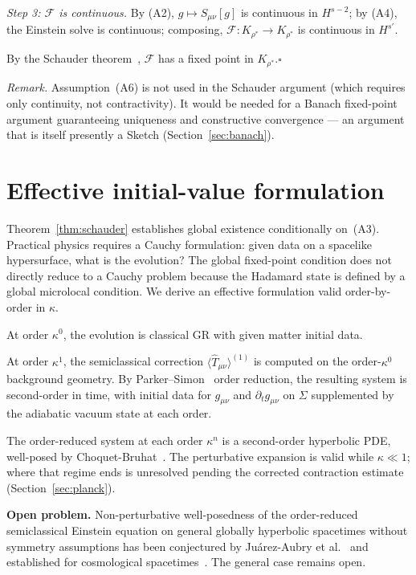 \documentclass[12pt,a4paper]{article}
\begin{document}
\smallskip\noindent\textit{Step 3: $\mathcal{F}$ is continuous.} By (A2), $g\mapsto
S_{\mu\nu}[g]$ is continuous in $H^{s-2}$; by (A4), the Einstein solve is continuous;
composing, $\mathcal{F}: K_{\rho^*}\to K_{\rho^*}$ is continuous in $H^{s'}$.

\smallskip\noindent By the Schauder theorem~\cite{schauder}, $\mathcal{F}$ has a fixed
point in $K_{\rho^*}$.\hfill$\square$

\noindent\emph{Remark.} Assumption~(A6) is not used in the Schauder argument (which
requires only continuity, not contractivity). It would be needed for a Banach fixed-point
argument guaranteeing uniqueness and constructive convergence --- an argument that is
itself presently a Sketch (Section~\ref{sec:banach}).

\section{Effective initial-value formulation}
\label{sec:ivp}

Theorem~\ref{thm:schauder} establishes global existence conditionally on~(A3).
Practical physics requires a
Cauchy formulation: given data on a spacelike hypersurface, what is the evolution? The
global fixed-point condition does not directly reduce to a Cauchy problem because the
Hadamard state is defined by a global microlocal condition. We derive an effective
formulation valid order-by-order in $\kappa$.

At order $\kappa^0$, the evolution is classical GR with given matter initial data.

At order $\kappa^1$, the semiclassical correction $\langle\hat{T}_{\mu\nu}\rangle^{(1)}$
is computed on the order-$\kappa^0$ background geometry. By Parker--Simon~\cite{parker_simon}
order reduction, the resulting system is second-order in time, with initial data for
$g_{\mu\nu}$ and $\partial_t g_{\mu\nu}$ on $\Sigma$ supplemented by the adiabatic vacuum
state at each order.

The order-reduced system at each order $\kappa^n$ is a second-order hyperbolic PDE,
well-posed by Choquet-Bruhat~\cite{choquet_bruhat}. The perturbative expansion is valid
while $\kappa \ll 1$; where that regime ends is unresolved pending the corrected
contraction estimate (Section~\ref{sec:planck}).

\noindent\textbf{Open problem.} Non-perturbative well-posedness of the order-reduced
semiclassical Einstein equation on general globally hyperbolic spacetimes without symmetry
assumptions has been conjectured by Ju\'arez-Aubry et al.~\cite{juarez_aubry} and
established for cosmological spacetimes~\cite{pinamonti_siemssen}. The general case
remains open.
\end{document}
